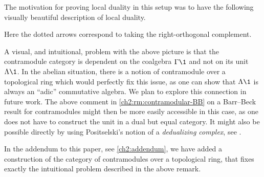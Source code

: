The motivation for proving local duality in this setup was to have the following visually beautiful description of local duality. 

\begin{center}
\end{center}

Here the dotted arrows correspond to taking the right-orthogonal complement. 

\begin{remark}
    \label{ch2:rm:contramodule-over-pro-ring}
    A visual, and intuitional, problem with the above picture is that the contramodule category is dependent on the coalgebra $\Gamma\1$ and not on its unit $\Lambda \1$. In the abelian situation, there is a notion of contramodule over a topological ring which would perfectly fix this issue, as one can show that $\Lambda \1$ is always an ``adic'' commutative algebra. We plan to explore this connection in future work. The above comment in \cref{ch2:rm:contramodular-BB} on a Barr--Beck result for contramodules might then be more easily accessible in this case, as one does not have to construct the unit in a dual but equal category. It might also be possible directly by using Positselski's notion of a \emph{dedualizing complex}, see \cite{positselski_2016}. 
\end{remark}

\begin{addendum}
    In the addendum to this paper, see \cref{ch2:addendum}, we have added a construction of the category of contramodules over a topological ring, that fixes exactly the intuitional problem described in the above remark. 
\end{addendum}

